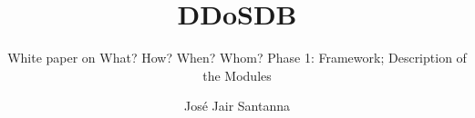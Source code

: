 \documentclass[sigconf]{acmart}
\begin{document}
\title{DDoSDB}
\subtitle{White paper on What? How? When? Whom? Phase 1: Framework; Description of the Modules }
\author{José Jair Santanna}
\maketitle




%
%
\end{document}
